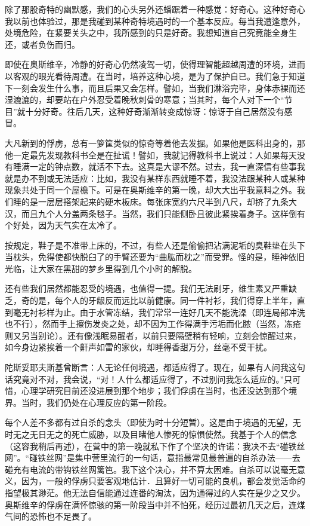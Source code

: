 \documentclass[11pt,oneside]{book}
\begin{document}
\begin{common-format}
除了那股奇特的幽默感，我们的心头另外还蟠踞着一种感觉：好奇心。这种好奇心我以前也体验过，那是我碰到某种奇特境遇时的一个基本反应。每当我遭逢意外，处境危险，在紧要关头之中，我所感到的只是好奇。我想知道自己究竟能全身生还，或者负伤而归。

即使在奥斯维辛，冷静的好奇心仍然凌驾一切，使得理智能超越周遭的环境，进而以客观的眼光看待周遭。在当时，培养这种心境，是为了保护自已。我们急于知道下一刻会发生什么事，而且后果又会怎样。譬如，当我们淋浴完毕，身体赤裸而还湿漉漉的，却要站在户外忍受着晚秋刺骨的寒意；当其时，每个人对下一个“节目”就十分好奇。往后几天，这种好奇渐渐转变成惊讶：惊讶于自己居然没有感冒。

大凡新到的俘虏，总有一箩筐类似的惊奇等着他去发掘。如果他是医科出身的，那他一定最先发现教科书全是在扯谎！譬如，我就记得教科书上说过：人如果每天没有睡满一定的钟点数，就活不下去。这真是大谬不然。过去，我一直深信有些事我就是办不到或无法适应：比如，我没有某样东西就睡不着，我没法跟某种人或某种现象共处于同一个屋檐下。可是在奥斯维辛的第一晚，却大大出乎我意料之外。我们睡的是一层层搭架起来的硬木板床。每张床宽约六尺半到八尺，却挤了九条大汉，而且九个人分盖两条毯子。当然，我们只能侧卧且彼此紧挨着身子。这样倒有个好处，因为天气实在太冷了。

按规定，鞋子是不准带上床的，不过，有些人还是偷偷把沾满泥垢的臭鞋垫在头下当枕头，免得使都快脱臼了的手臂还要为“曲肱而枕之”而受罪。怪的是，睡神依旧光临，让大家在黑甜的梦乡里得到几个小时的解脱。

还有些我们居然都能忍受的境遇，也值得一提。我们无法刷牙，维生素又严重缺乏，奇的是，每个人的牙龈反而远比以前健康。同一件衬衫，我们得穿上半年，直到毫无衬衫样为止。由于水管冻结，我们常常一连好几天不能洗澡（即连局部冲洗也不行），然而手上擦伤发炎之处，却不因为工作得满手污垢而化脓（当然，冻疮则又另当别论）。还有像浅眠易醒者，以前只要隔壁稍有轻响，立刻会惊醒过来，如今身边紧挨着一个鼾声如雷的家伙，却睡得香甜万分，丝毫不受干扰。


陀斯妥耶夫斯基曾断言：人无论任何境遇，都适应得了。现在，如果有人问我这句话究竟对不对，我会说，“对！人什么都适应得了，不过别问我怎么适应的。”只可惜，心理学研究目前还没进展到那个地步；我们俘虏在当时，也还没达到那个境界。当时，我们仍处在心理反应的第一阶段。

每个人差不多都有过自杀的念头（即使为时十分短暂）。这是由于境遇的无望，无时无之无日无之的死亡威胁，以及目睹他人惨死的惊惧使然。我基于个人的信念（这容我稍后再述），在营中的第一晚就私下作了个坚决的许诺：我决不去“碰铁丝网”。“碰铁丝网”是集中营里流行的一句话，意指最常见最普遍的自杀办法——去碰充有电流的带钩铁丝网篱笆。我下这个决心，并不算太困难。自杀可以说毫无意义，因为，一般的俘虏只要客观地估计．且算好一切可能的良机，都会发觉活命的指望极其渺茫。他无法自信能通过连番的淘汰，因为通得过的人实在是少之又少。奥斯维辛的俘虏在满怀惊骇的第一阶段当中并不怕死，经历过最初几天之后，连煤气间的恐怖也不足畏了。


\end{common-format}
\end{document}
